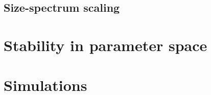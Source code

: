 \documentclass[10pt]{article}
\begin{document}
\subsection{Size-spectrum scaling}

\section{Stability in parameter space}

\section{Simulations}

\begin{comment} 
\section{General production with GLV interactions}
Consider the system of $S$ species
\begin{equation}
    \frac{dn_i}{dt} = P(n_i) - n_i\sum_{j\neq i}A_{ij}n_j \, ,
\end{equation}
where the summation runs over all the species and we leave the production function generic
and $A$ is a matrix with zero diagonal and off-diagonal elements gaussianly
ditrubuted with mean $\mu$ and standard deviation $\sigma$.
The community matrix reads in this case
\begin{equation}
    C = -D(n^*)A - D(P(n^*)/n^*-P'(n^*)) \, ,
\end{equation}
where the notation $D(x)$ stands for a diagonal matrix filled 
with the components of the vector
$x$ and $P(n^*)=(P(n_1^*), ..., P(n_S^*))$ and $P'(n^*)=(dP(n_1^*)/dn_1^*, ..., dP(n_S^*)/dn_S^*)$.

We have instability when
\begin{equation}
    \sum_i \frac{1}{|\mu -P(n_i^*)/(n_i^*)^2+P'(n_i^*)/n_i^*|^2}\geq 1/\sigma^2 \, .
\end{equation}
\end{comment}

\newpage




\end{document}
